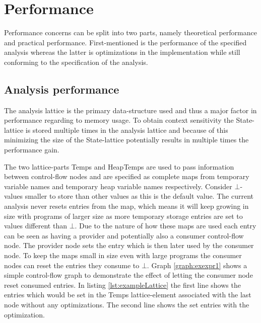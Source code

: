 \section{Performance}
Performance concerns can be split into two parts, namely theoretical performance and practical performance. First-mentioned is the performance of the specified analysis whereas the latter is optimizations in the implementation while still conforming to the specification of the analysis.


\subsection{Analysis performance}
The analysis lattice is the primary data-structure used and thus a major factor in performance regarding to memory usage. To obtain context sensitivity the State-lattice is stored multiple times in the analysis lattice and because of this minimizing the size of the State-lattice potentially results in multiple times the performance gain.

The two lattice-parts Temps and HeapTemps are used to pass information between control-flow nodes and are specified as complete maps from temporary variable names and temporary heap variable names respectively. Consider $\bot$-values smaller to store than other values as this is the default value. The current analysis never resets entries from the map, which means it will keep growing in size with programs of larger size as more temporary storage entries are set to values different than $\bot$. Due to the nature of how these maps are used each entry can be seen as having a provider and potentially also a consumer control-flow node. The provider node sets the entry which is then later used by the consumer node. To keep the maps small in size even with large programs the consumer nodes can reset the entries they consume to $\bot$. Graph \ref{graph:exexpr1} shows a simple control-flow graph to demonstrate the effect of letting the consumer node reset consumed entries. In listing \ref{lst:exampleLattice} the first line shows the entries which would be set in the Temps lattice-element associated with the last node without any optimizations. The second line shows the set entries with the optimization.

